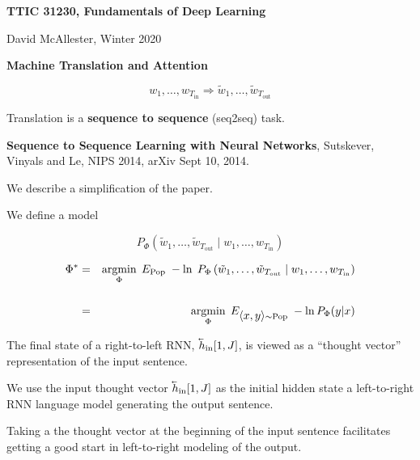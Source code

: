 




{\Huge

  \centerline{\bf TTIC 31230, Fundamentals of Deep Learning}
  \bigskip
  \centerline{David McAllester, Winter 2020}
  \vfill
  \centerline{\bf Machine Translation and Attention}



$$w_1,\ldots,w_{T_{\mathrm{in}}} \Rightarrow \tilde{w}_1,\ldots,\tilde{w}_{T_{\mathrm{out}}}$$

\vfill
Translation is a {\bf sequence to sequence} (seq2seq) task.

\vfill
{\bf Sequence to Sequence Learning with Neural Networks}, Sutskever, Vinyals and Le, NIPS 2014, arXiv Sept 10, 2014.

\vfill
We describe a simplification of the paper.




\vfill
We define a model

\vfill
$$P_\Phi\left(\tilde{w}_1,\ldots,\tilde{w}_{T_{\mathrm{out}}}\;|\; w_1,\ldots,w_{T_{\mathrm{in}}}\right)$$

\vfill
\begin{eqnarray*}
\Phi^*  & = & \operatorname*{argmin}_\Phi\; E_{\mathrm{Pop}} \;-\ln\;P_\Phi\left(\tilde{w}_1,\ldots,\tilde{w}_{T_{\mathrm{out}}}\;|\; w_1,\ldots,w_{T_{\mathrm{in}}}\right) \\
\\
& = & \operatorname*{argmin}_\Phi \; E_{{\mbox{$\langle x,y\rangle$}} \sim \mathrm{Pop}} \; -\ln P_\Phi(y|x)
\end{eqnarray*}



\vfill
The final state of a right-to-left RNN, $\cev{h}_{\mathrm{in}}[1,J]$, is viewed as a ``thought vector'' representation of the input sentence.

\vfill
We use the input thought vector $\cev{h}_{\mathrm{in}}[1,J]$ as the initial hidden state a left-to-right RNN language model
generating the output sentence.

\vfill
Taking a the thought vector at the beginning of the input sentence facilitates getting a good start in left-to-right modeling of the output.

}
